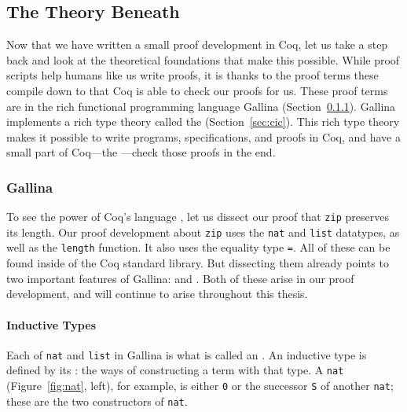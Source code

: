 \subsection{The Theory Beneath}
\label{sec:mot-theory}

Now that we have written a small proof development in Coq, let us take a step back and look at the theoretical foundations that make this possible.
While proof scripts help humans like us write proofs, it is thanks to the proof terms these compile down to that Coq is able to check our proofs for us.
These proof terms are in the rich functional programming language Gallina (Section~\ref{sec:gallina}).
Gallina implements a rich type theory called the  (Section~\ref{sec:cic}).
This rich type theory makes it possible to write programs, specifications, and proofs in Coq,
and have a small part of Coq---the ---check those proofs in the end.

\subsubsection{Gallina}
\label{sec:gallina}

To see the power of Coq's  language , let us dissect our proof that \lstinline{zip} preserves its length.
Our proof development about \lstinline{zip} uses the \lstinline{nat} and \lstinline{list} datatypes,
as well as the \lstinline{length} function.
It also uses the equality type \lstinline{=}.
All of these can be found inside of the Coq standard library.
But dissecting them already points to two important features of Gallina:
 and .
Both of these arise in our proof development, and will continue to arise throughout this thesis.

\paragraph{Inductive Types}

Each of \lstinline{nat} and \lstinline{list} in Gallina is what is called an .
An inductive type is defined by its : the ways of constructing a term with that type.
A \lstinline{nat} (Figure~\ref{fig:nat}, left), for example,
is either \lstinline{0} or the successor \lstinline{S} of another \lstinline{nat};
these are the two constructors of \lstinline{nat}.

